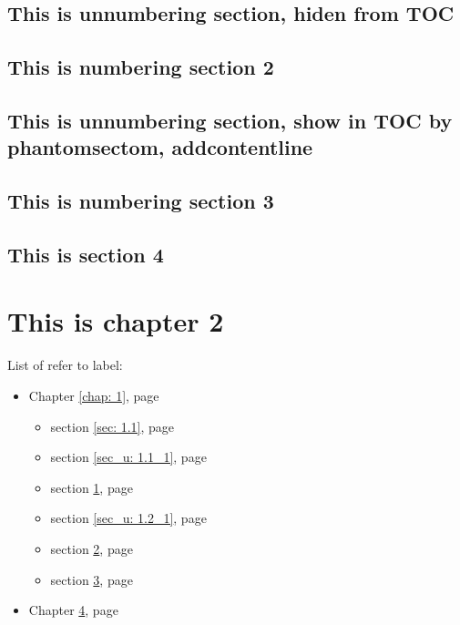 \documentclass[12pt, a4paper, twoside]{report}
\begin{document}
\section*{This is unnumbering section, hiden from TOC}
    \label{sec_u: 1.1_1}
\section{This is numbering section 2}
    \label{sec: 1.2}

{}
\section*{This is unnumbering section, show in TOC by phantomsectom, addcontentline}
    \label{sec_u: 1.2_1}

\section{This is numbering section 3}
    \label{sec: 1.3}

\section[This is short of section 4]{This is section 4}
    \label{sec: 1.4}



\chapter{This is chapter 2}
    \label{chap: 2}

List of refer to label:\\

\begin{itemize}
\item  Chapter \ref{chap: 1}, page \pageref{chap: 1}
    \begin{itemize}
        \item section \ref{sec: 1.1}, page \pageref{sec: 1.1}
        \item section \ref{sec_u: 1.1_1}, page \pageref{sec: 1.1}
        \item section \ref{sec: 1.2}, page \pageref{sec: 1.2}
        \item section \ref{sec_u: 1.2_1}, page \pageref{sec_u: 1.2_1}
        \item section \ref{sec: 1.3}, page \pageref{sec: 1.3}
        \item section \ref{sec: 1.4}, page \pageref{sec: 1.4}
    \end{itemize}
\item  Chapter \ref{chap: 2}, page \pageref{chap: 2}
\end{itemize}
\end{document}
